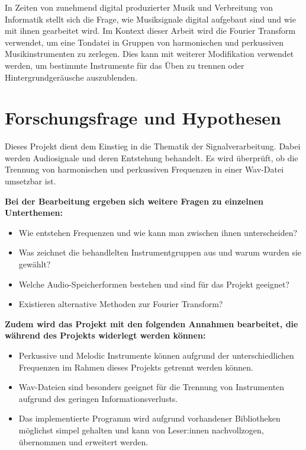 \par

In Zeiten von zunehmend digital produzierter Musik und Verbreitung von Informatik stellt sich die Frage, wie Musiksignale digital aufgebaut sind und wie mit ihnen gearbeitet wird.
Im Kontext dieser Arbeit wird die Fourier Transform verwendet, um eine Tondatei in Gruppen von harmonischen und perkussiven Musikinstrumenten zu zerlegen.
Dies kann mit weiterer Modifikation verwendet werden, um bestimmte Instrumente für das Üben zu trennen oder Hintergrundgeräusche auszublenden.


%
\section{Forschungsfrage und Hypothesen}
\label{research-question-and-hypotheses}
%

Dieses Projekt dient dem Einstieg in die Thematik der Signalverarbeitung. Dabei werden Audiosignale und deren Entstehung behandelt.
Es wird überprüft, ob die Trennung von harmonischen und perkussiven Frequenzen in einer Wav-Datei umsetzbar ist.

\par

\textbf{Bei der Bearbeitung ergeben sich weitere Fragen zu einzelnen Unterthemen:}

%
\begin{itemize}
    \item Wie entstehen Frequenzen und wie kann man zwischen ihnen unterscheiden?
    \item Was zeichnet die behandlelten Instrumentgruppen aus und warum wurden sie gewählt?
    \item Welche Audio-Speicherformen bestehen und sind für das Projekt geeignet?
    \item Existieren alternative Methoden zur Fourier Transform? 
\end{itemize}
%

\textbf{Zudem wird das Projekt mit den folgenden Annahmen bearbeitet, die während des Projekts widerlegt werden können:}

%
\begin{itemize}
    \item Perkussive und Melodic Instrumente können aufgrund der unterschiedlichen Frequenzen im Rahmen dieses Projekts getrennt werden können.
    \item Wav-Dateien sind besonders geeignet für die Trennung von Instrumenten aufgrund des geringen Informationsverlusts.
    \item Das implementierte Programm wird aufgrund vorhandener Bibliotheken möglichst simpel gehalten und kann von Leser:innen nachvollzogen, übernommen und erweitert werden.
\end{itemize}
%

